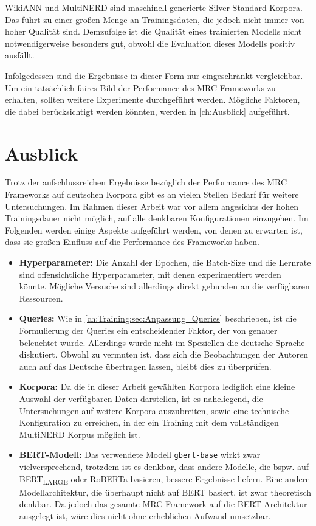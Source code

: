 WikiANN und MultiNERD sind maschinell generierte Silver-Standard-Korpora. Das führt zu einer großen Menge an Trainingsdaten, die jedoch nicht immer von hoher Qualität sind. Demzufolge ist die Qualität eines trainierten Modells nicht notwendigerweise besonders gut, obwohl die Evaluation dieses Modells positiv ausfällt.

Infolgedessen sind die Ergebnisse in dieser Form nur eingeschränkt vergleichbar. Um ein tatsächlich faires Bild der Performance des MRC Frameworks zu erhalten, sollten weitere Experimente durchgeführt werden. Mögliche Faktoren, die dabei berücksichtigt werden könnten, werden in \autoref{ch:Ausblick} aufgeführt.

\chapter{Ausblick}
\label{ch:Ausblick}

Trotz der aufschlussreichen Ergebnisse bezüglich der Performance des MRC Frameworks auf deutschen Korpora gibt es an vielen Stellen Bedarf für weitere Untersuchungen. Im Rahmen dieser Arbeit war vor allem angesichts der hohen Trainingsdauer nicht möglich, auf alle denkbaren Konfigurationen einzugehen. Im Folgenden werden einige Aspekte aufgeführt werden, von denen zu erwarten ist, dass sie großen Einfluss auf die Performance des Frameworks haben.

\begin{itemize}
	\item \textbf{Hyperparameter:} Die Anzahl der Epochen, die Batch-Size und die Lernrate sind offensichtliche Hyperparameter, mit denen experimentiert werden könnte. Mögliche Versuche sind allerdings direkt gebunden an die verfügbaren Ressourcen.
	\item \textbf{Queries:} Wie in \autoref{ch:Training:sec:Anpassung_Queries} beschrieben, ist die Formulierung der Queries ein entscheidender Faktor, der von  genauer beleuchtet wurde. Allerdings wurde nicht im Speziellen die deutsche Sprache diskutiert. Obwohl zu vermuten ist, dass sich die Beobachtungen der Autoren auch auf das Deutsche übertragen lassen, bleibt dies zu überprüfen.
	\item \textbf{Korpora:} Da die in dieser Arbeit gewählten Korpora lediglich eine kleine Auswahl der verfügbaren Daten darstellen, ist es naheliegend, die Untersuchungen auf weitere Korpora auszubreiten, sowie eine technische Konfiguration zu erreichen, in der ein Training mit dem vollständigen MultiNERD Korpus möglich ist.
	\item \textbf{BERT-Modell:} Das verwendete Modell \verb|gbert-base| wirkt zwar vielversprechend, trotzdem ist es denkbar, dass andere Modelle, die bspw. auf BERT\textsubscript{LARGE} oder RoBERTa basieren, bessere Ergebnisse liefern. Eine andere Modellarchitektur, die überhaupt nicht auf BERT basiert, ist zwar theoretisch denkbar. Da jedoch das gesamte MRC Framework auf die BERT-Architektur ausgelegt ist, wäre dies nicht ohne erheblichen Aufwand umsetzbar.
\end{itemize}

